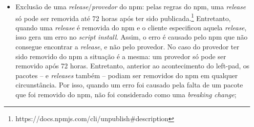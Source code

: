 \begin{itemize}

    \item Exclusão de uma \textit{release}/\textit{provedor} do \textsf{npm}: pelas regras do \textsf{npm}, uma \textit{release} só pode ser removida até 72 horas após ter sido publicada.\footnote{https://docs.npmjs.com/cli/unpublish\#description} Entretanto, quando uma \textit{release} é removida do \textsf{npm} e o cliente especificou aquela \textit{release}, isso gera um erro no \textit{script install}. Assim, o erro é causado pelo \textsf{npm} que não consegue encontrar a \textit{release}, e não pelo provedor. No caso do provedor ter sido removido do \textsf{npm} a situação é a mesma: um provedor só pode ser removido após 72 horas. Entretanto, anterior ao acontecimento do \textsf{left-pad}, os pacotes -- e \textit{releases} também -- podiam ser removidos do \textsf{npm} em qualquer circunstância. Por isso, quando um erro foi causado pela falta de um pacote que foi removido do \textsf{npm}, não foi considerado como uma \textit{breaking change};


\end{itemize}
